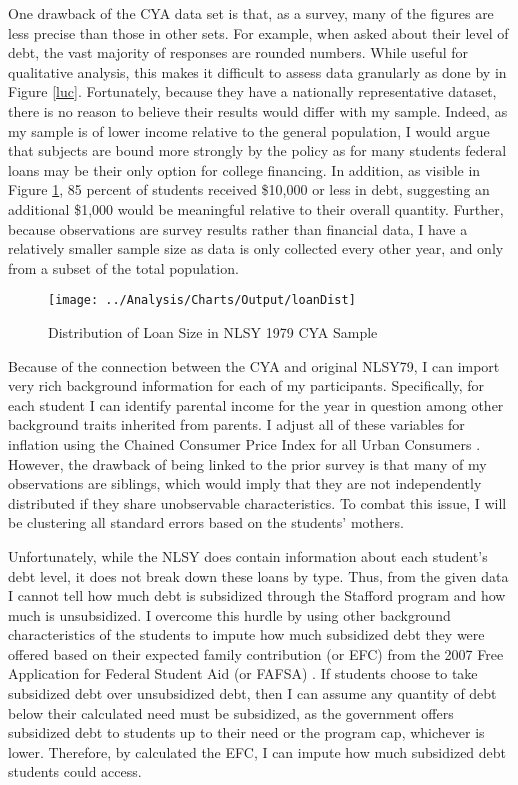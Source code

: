 \documentclass[12pt]{article}
\begin{document}
	One drawback of the CYA data set is that, as a survey, many of the figures are less precise than those in other sets. For example, when asked about their level of debt, the vast majority of responses are rounded numbers. While useful for qualitative analysis, this makes it difficult to assess data granularly as done by \textcite{lucca2018} in Figure \ref{luc}. Fortunately, because they have a nationally representative dataset, there is no reason to believe their results would differ with my sample. Indeed, as my sample is of lower income relative to the general population, I would argue that subjects are bound more strongly by the policy as for many students federal loans may be their only option for college financing. In addition, as visible in Figure \ref{loanDist}, 85 percent of students received \$10,000 or less in debt, suggesting an additional \$1,000 would be meaningful relative to their overall quantity. Further, because observations are survey results rather than financial data, I have a relatively smaller sample size as data is only collected every other year, and only from a subset of the total population.
	

	\begin{figure}
		\centering
		\caption{Distribution of Loan Size in NLSY 1979 CYA Sample}
		\label{loanDist}
		\texttt{[image: ../Analysis/Charts/Output/loanDist]}
	\end{figure}

	
	Because of the connection between the CYA and original NLSY79, I can import very rich background information for each of my participants. Specifically, for each student I can identify parental income for the year in question among other background traits inherited from parents. I adjust all of these variables for inflation using the Chained Consumer Price Index for all Urban Consumers \parencite{bls2019}. However, the drawback of being linked to the prior survey is that many of my observations are siblings, which would imply that they are not independently distributed if they share unobservable characteristics. To combat this issue, I will be clustering all standard errors based on the students' mothers. 
	
	Unfortunately, while the NLSY does contain information about each student's debt level, it does not break down these loans by type. Thus, from the given data I cannot tell how much debt is subsidized through the Stafford program and how much is unsubsidized. I overcome this hurdle by using other background characteristics of the students to impute how much subsidized debt they were offered based on their expected family contribution (or EFC) from the 2007 Free Application for Federal Student Aid (or FAFSA) \parencite{doe2007}. If students choose to take subsidized debt over unsubsidized debt, then I can assume any quantity of debt below their calculated need must be subsidized, as the government offers subsidized debt to students up to their need or the program cap, whichever is lower. Therefore, by calculated the EFC, I can impute how much subsidized debt students could access.
	
\end{document}
